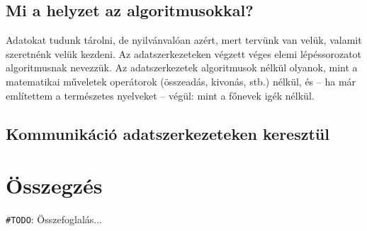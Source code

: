 \documentclass[tocnopagenum]{thesis-ekf}
\newtheorem{tetel}{Tétel}[chapter]
\theoremstyle{definition}
\newtheorem{definicio}[tetel]{Definíció}
\theoremstyle{remark}
\newtheorem{megjegyzes}[tetel]{Megjegyzés}
\begin{document}
	\section{Mi a helyzet az algoritmusokkal?}
	Adatokat tudunk tárolni, de nyilvánvalóan azért, mert tervünk van velük, valamit szeretnénk velük kezdeni. Az adatszerkezeteken végzett véges elemi lépéssorozatot algoritmusnak nevezzük. Az adatszerkezetek algoritmusok nélkül olyanok, mint a matematikai műveletek operátorok (összeadás, kivonás, stb.) nélkül, és -- ha már említettem a természetes nyelveket -- végül: mint a főnevek igék nélkül.
	\section{Kommunikáció adatszerkezeteken keresztül}
	
	\begin{comment}
		Ezek később lesznek hasznosak
		\begin{tetel}
			Tétel szövege.
		\end{tetel}
		
		\begin{proof}
			Bizonyítás szövege.
		\end{proof}
		
		\begin{definicio}
			Definíció szövege.
		\end{definicio}
		
		\begin{megjegyzes}
			Megjegyzés szövege.
		\end{megjegyzes}
	\end{comment}
	
	\chapter*{Összegzés}
	\verb*|#TODO|: Összefoglalás...
	
	
	
\end{document}
